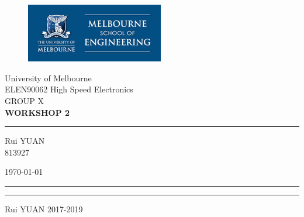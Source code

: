 \documentclass[pdftex,12pt,a4paper]{article}
\begin{document}
\graphicspath{{./figs/}}
\begin{titlepage}
\begin{center}
\begin{figure}[H]
      \includegraphics[width=6cm]{logo.png}
    \end{figure}
	
	
	{\color[RGB]{0,0,128} {\huge University of Melbourne}\\[0.5\baselineskip] %
		{\Huge ELEN90062 High Speed Electronics  }\\[0.5\baselineskip] %
		{\Huge GROUP X}}\\ %
\vspace{0.05\textheight} %
\huge \bfseries WORKSHOP 2
\rule{\textwidth}{1pt} %
\vspace{0.02\textheight} %
\begin{flushright} \large
Rui \textsc{YUAN}\\
813927 \\
\end{flushright}
\vfill
\begin{flushright} \large
{\large \today}
\end{flushright}
\rule{\textwidth}{0.4pt} %
	
	\vspace{2pt}\vspace{-\baselineskip} %
	
	\rule{\textwidth}{1pt} %
\begin{flushright} \tiny
{\scriptsize  \textcopyright \quad Rui YUAN 2017-2019}
\end{flushright}
\end{center}
\end{titlepage}


\newpage
\end{document}
